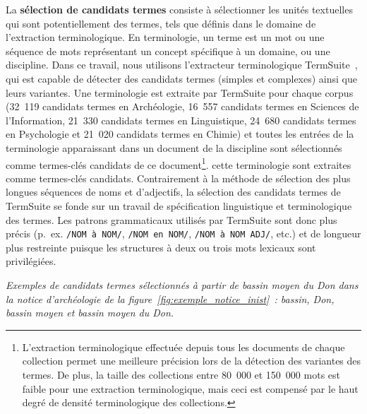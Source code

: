     La \textbf{sélection de candidats termes} consiste à sélectionner les unités
    textuelles qui sont potentiellement des termes, tels que définis dans le
    domaine de l'extraction terminologique. En terminologie, un terme est un mot
    ou une séquence de mots représentant un concept spécifique à un domaine, ou
    une discipline. Dans ce travail, nous utilisons l'extracteur terminologique
    TermSuite~\cite{rocheteau2011termsuite}, qui est capable de détecter des
    candidats termes (simples et complexes) ainsi que leurs variantes. Une
    terminologie est extraite par TermSuite  pour chaque corpus (32~119
    candidats termes en Archéologie, 16~557 candidats termes en Sciences de
    l'Information, 21~330 candidats termes en Linguistique, 24~680 candidats
    termes en Psychologie et 21~020 candidats termes en Chimie) et toutes les
    entrées de la terminologie apparaissant dans un document de la discipline
    sont sélectionnés comme termes-clés candidats de ce
    document\footnote{L'extraction terminologique effectuée depuis tous les
    documents de chaque collection permet une meilleure précision lors de la
    détection des variantes des termes. De plus, la taille des
    collections entre 80~000 et 150~000 mots
    est faible pour une extraction terminologique, mais ceci est compensé
    par le haut degré de densité terminologique des collections.}.
    cette terminologie sont extraites comme termes-clés candidats.
    Contrairement à la méthode de sélection des plus longues séquences de noms
    et d'adjectifs, la sélection des candidats termes de TermSuite se fonde sur
    un travail de spécification linguistique et terminologique des termes. Les
    patrons grammaticaux utilisés par TermSuite sont donc plus précis (p.~ex.
    \texttt{/NOM à NOM/}, \texttt{/NOM en NOM/}, \texttt{/NOM à NOM ADJ/},
    etc.) et de longueur plus restreinte puisque les structures à deux ou trois
    mots lexicaux sont privilégiées.
    
    \textit{Exemples de candidats termes sélectionnés à partir de \og{}bassin
    moyen du Don\fg{} dans la notice d'archéologie de la
    figure~\ref{fig:exemple_notice_inist}~: \og{}bassin\fg{}, \og{}Don\fg{},
    \og{}bassin moyen\fg{} et \og{}bassin moyen du Don\fg{}.}

